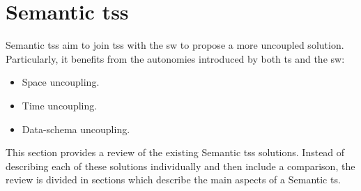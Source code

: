 \section{Semantic \aclp{ts}}
\label{sec:soa_tsc}


Semantic \aclp{ts} aim to join \aclp{ts} with the \acl{sw} to propose a more uncoupled solution.
Particularly, it benefits from the autonomies introduced by both \ac{ts} and the \ac{sw}:

\begin{itemize}
  \item Space uncoupling.
  \item Time uncoupling.
  \item Data-schema uncoupling. %
\end{itemize}


This section provides a review of the existing Semantic \aclp{ts} solutions. %
Instead of describing each of these solutions individually and then include a comparison,
the review is divided in sections which describe the main aspects of a Semantic \ac{ts}.




\newcommand{\midtsc}{\acs{tscm} \citep{fensel_tsc_2007}}
\newcommand{\midsws}{\acs{sws} \citep{tolksdorf_coordination_2006}}
\newcommand{\midstuples}{\acs{stuples} \citep{khushraj_stuples:_2004}}
\newcommand{\midcspaces}{\acs{cspaces} \citep{martinrecuerda_towards_2005}}
\newcommand{\midtscpp}{\acs{tscpp} \citep{krummenacher_open_2009,blunder_distributed_2009}}
\newcommand{\midtripcom}{\acs{tripcom} \citep{simperl_coordination_2007}}
\newcommand{\midsmartmt}{\acs{smartm3} \citep{honkola_smart-m3_2010}}
\newcommand{\midnardini}{\citet{nardini_semantic_2013}}


